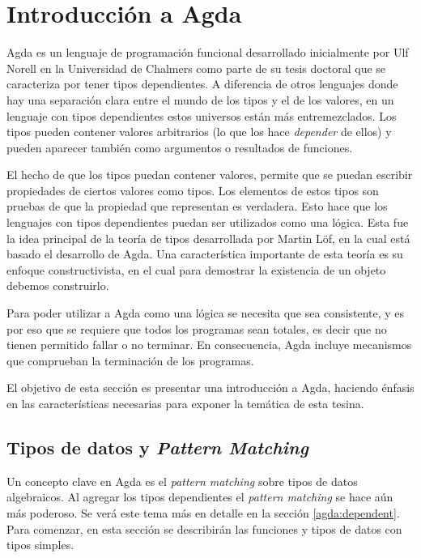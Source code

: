\chapter{Introducci\'on a Agda} \label{chapter:agda}

Agda es un lenguaje de programación funcional desarrollado inicialmente por Ulf Norell en la Universidad de Chalmers como parte de su tesis doctoral \cite{norell:thesis} que se caracteriza por tener tipos dependientes. A diferencia de otros lenguajes donde hay una separación clara entre el mundo de los tipos y el de los valores, en un lenguaje con tipos dependientes estos universos están más entremezclados. Los tipos pueden contener valores arbitrarios (lo que los hace \textit{depender} de ellos) y pueden aparecer también como argumentos o resultados de funciones.

El hecho de que los tipos puedan contener valores, permite que se puedan escribir propiedades de ciertos valores como tipos. Los elementos de estos tipos son pruebas de que la propiedad que representan es verdadera. Esto hace que los lenguajes con tipos dependientes puedan ser utilizados como una lógica. Esta fue la idea principal de la teoría de tipos desarrollada por Martin Löf, en la cual está basado el desarrollo de Agda. Una característica importante de esta teoría es su enfoque constructivista, en el cual para demostrar la existencia de un objeto debemos construirlo.

Para poder utilizar a Agda como una lógica se necesita que sea consistente, y es por eso que se requiere que todos los programas sean totales, es decir que no tienen permitido fallar o no terminar. En consecuencia, Agda incluye mecanismos que comprueban la terminación de los programas.

El objetivo de esta sección es presentar una introducción a Agda, haciendo énfasis en las características necesarias para exponer la temática de esta tesina. 

\section{Tipos de datos y \textit{Pattern Matching}}\label{agda:tipos}

Un concepto clave en Agda es el \textit{pattern matching} sobre tipos de datos algebraicos. Al agregar los tipos dependientes el \textit{pattern matching} se hace aún más poderoso. Se verá este tema más en detalle en la sección \ref{agda:dependent}. Para comenzar, en esta sección se describirán las funciones y tipos de datos con tipos simples. 

